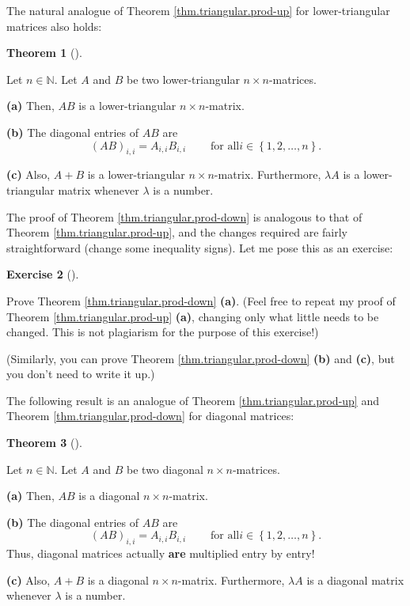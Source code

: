 \documentclass[numbers=enddot,12pt,final,onecolumn,notitlepage]{scrartcl}%
\theoremstyle{definition}
\newtheorem{theo}{Theorem}[section]
\newenvironment{theorem}[1][]
{\begin{theo}[#1]\begin{leftbar}}
{\end{leftbar}\end{theo}}
\newtheorem{exmp}[theo]{Exercise}
\newenvironment{exercise}[1][]
{\begin{exmp}[#1]\begin{leftbar}}
{\end{leftbar}\end{exmp}}
\begin{document}
The natural analogue of Theorem \ref{thm.triangular.prod-up} for
lower-triangular matrices also holds:

\begin{theorem}
\label{thm.triangular.prod-down}Let $n\in\mathbb{N}$. Let $A$ and $B$ be two
lower-triangular $n\times n$-matrices.

\textbf{(a)} Then, $AB$ is a lower-triangular $n\times n$-matrix.

\textbf{(b)} The diagonal entries of $AB$ are%
\[
\left(  AB\right)  _{i,i}=A_{i,i}B_{i,i}\ \ \ \ \ \ \ \ \ \ \text{for all
}i\in\left\{  1,2,\ldots,n\right\}  .
\]


\textbf{(c)} Also, $A+B$ is a lower-triangular $n\times n$-matrix.
Furthermore, $\lambda A$ is a lower-triangular matrix whenever $\lambda$ is a number.
\end{theorem}

The proof of Theorem \ref{thm.triangular.prod-down} is analogous to that of
Theorem \ref{thm.triangular.prod-up}, and the changes required are fairly
straightforward (change some inequality signs). Let me pose this as an exercise:

\begin{exercise}
\label{exe.thm.triangular.prod-down}Prove Theorem
\ref{thm.triangular.prod-down} \textbf{(a)}. (Feel free to repeat my proof of
Theorem \ref{thm.triangular.prod-up} \textbf{(a)}, changing only what little
needs to be changed. This is not plagiarism for the purpose of this exercise!)

(Similarly, you can prove Theorem \ref{thm.triangular.prod-down} \textbf{(b)}
and \textbf{(c)}, but you don't need to write it up.)
\end{exercise}

The following result is an analogue of Theorem \ref{thm.triangular.prod-up}
and Theorem \ref{thm.triangular.prod-down} for diagonal matrices:

\begin{theorem}
\label{thm.triangular.prod-diag}Let $n\in\mathbb{N}$. Let $A$ and $B$ be two
diagonal $n\times n$-matrices.

\textbf{(a)} Then, $AB$ is a diagonal $n\times n$-matrix.

\textbf{(b)} The diagonal entries of $AB$ are%
\[
\left(  AB\right)  _{i,i}=A_{i,i}B_{i,i}\ \ \ \ \ \ \ \ \ \ \text{for all
}i\in\left\{  1,2,\ldots,n\right\}  .
\]
Thus, diagonal matrices actually \textbf{are} multiplied entry by entry!

\textbf{(c)} Also, $A+B$ is a diagonal $n\times n$-matrix. Furthermore,
$\lambda A$ is a diagonal matrix whenever $\lambda$ is a number.
\end{theorem}
\end{document}
